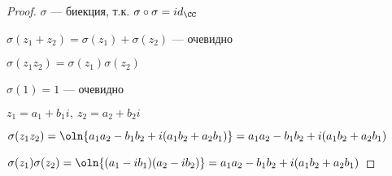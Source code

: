 \begin{proof}
    
    $\sigma$ --- биекция, т.к. $\sigma \circ \sigma = id_{\CC}$
    
    $\sigma(z_1 + z_2) = \sigma(z_1) + \sigma(z_2)$ --- очевидно
    
    $\sigma(z_1 z_2) = \sigma(z_1) \sigma(z_2)$
    
    $\sigma(1) = 1$ --- очевидно
    
    $z_1 = a_1 + b_1i,~z_2 = a_2 + b_2i$
    
    $\sigma(z_1 z_2) = \oln{a_1 a_2 - b_1 b_2 + i(a_1 b_2 + a_2 b_1)} = a_1 a_2 - b_1 b_2 + i(a_1 b_2 + a_2 b_1)$
    
    $\sigma(z_1) \sigma(z_2) = \oln{(a_1 - i b_1) (a_2 - i b_2)} = a_1 a_2 - b_1 b_2 + i(a_1 b_2 + a_2 b_1)$
\end{proof}